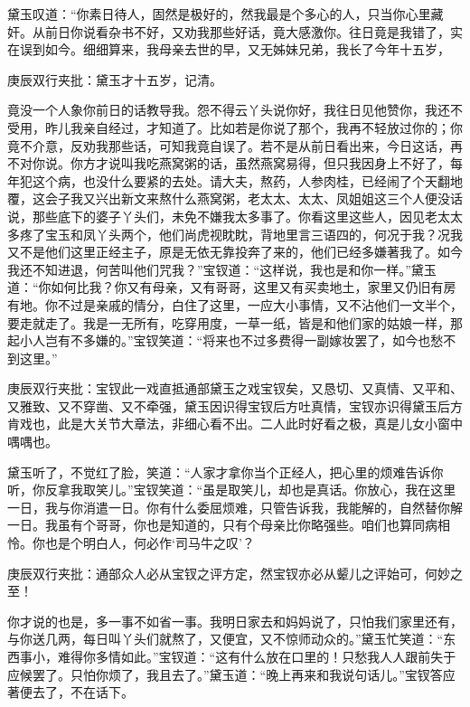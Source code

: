 \begin{parag}
    黛玉叹道：“你素日待人，固然是极好的，然我最是个多心的人，只当你心里藏奸。从前日你说看杂书不好，又劝我那些好话，竟大感激你。往日竟是我错了，实在误到如今。细细算来，我母亲去世的早，又无姊妹兄弟，我长了今年十五岁，\begin{note}庚辰双行夹批：黛玉才十五岁，记清。\end{note}竟没一个人象你前日的话教导我。怨不得云丫头说你好，我往日见他赞你，我还不受用，昨儿我亲自经过，才知道了。比如若是你说了那个，我再不轻放过你的；你竟不介意，反劝我那些话，可知我竟自误了。若不是从前日看出来，今日这话，再不对你说。你方才说叫我吃燕窝粥的话，虽然燕窝易得，但只我因身上不好了，每年犯这个病，也没什么要紧的去处。请大夫，熬药，人参肉桂，已经闹了个天翻地覆，这会子我又兴出新文来熬什么燕窝粥，老太太、太太、凤姐姐这三个人便没话说，那些底下的婆子丫头们，未免不嫌我太多事了。你看这里这些人，因见老太太多疼了宝玉和凤丫头两个，他们尚虎视眈眈，背地里言三语四的，何况于我？况我又不是他们这里正经主子，原是无依无靠投奔了来的，他们已经多嫌著我了。如今我还不知进退，何苦叫他们咒我？”宝钗道：“这样说，我也是和你一样。”黛玉道：“你如何比我？你又有母亲，又有哥哥，这里又有买卖地土，家里又仍旧有房有地。你不过是亲戚的情分，白住了这里，一应大小事情，又不沾他们一文半个，要走就走了。我是一无所有，吃穿用度，一草一纸，皆是和他们家的姑娘一样，那起小人岂有不多嫌的。”宝钗笑道：“将来也不过多费得一副嫁妆罢了，如今也愁不到这里。”\begin{note}庚辰双行夹批：宝钗此一戏直抵通部黛玉之戏宝钗矣，又恳切、又真情、又平和、又雅致、又不穿凿、又不牵强，黛玉因识得宝钗后方吐真情，宝钗亦识得黛玉后方肯戏也，此是大关节大章法，非细心看不出。二人此时好看之极，真是儿女小窗中喁喁也。\end{note}黛玉听了，不觉红了脸，笑道：“人家才拿你当个正经人，把心里的烦难告诉你听，你反拿我取笑儿。”宝钗笑道：“虽是取笑儿，却也是真话。你放心，我在这里一日，我与你消遣一日。你有什么委屈烦难，只管告诉我，我能解的，自然替你解一日。我虽有个哥哥，你也是知道的，只有个母亲比你略强些。咱们也算同病相怜。你也是个明白人，何必作‘司马牛之叹’？\begin{note}庚辰双行夹批：通部众人必从宝钗之评方定，然宝钗亦必从颦儿之评始可，何妙之至！\end{note}你才说的也是，多一事不如省一事。我明日家去和妈妈说了，只怕我们家里还有，与你送几两，每日叫丫头们就熬了，又便宜，又不惊师动众的。”黛玉忙笑道：“东西事小，难得你多情如此。”宝钗道：“这有什么放在口里的！只愁我人人跟前失于应候罢了。只怕你烦了，我且去了。”黛玉道：“晚上再来和我说句话儿。”宝钗答应著便去了，不在话下。
\end{parag}


